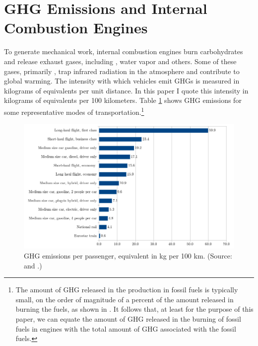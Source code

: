 \documentclass{article}[12pt,letterpaper]
\begin{document}
\section{GHG Emissions and Internal Combustion Engines}
To generate mechanical work, internal combustion engines burn carbohydrates and release exhaust gases, including \cadi, water vapor and others. Some of these gases, primarily \cadi, trap infrared radiation in the atmosphere and contribute to global warming. The intensity with which vehicles emit GHGs is measured in kilograms of \cadi equivalents per unit distance. In this paper I quote this intensity in kilograms of \cadi equivalents per 100 kilometers. Table \ref{fig:GHG-and-means-of-transportation} shows GHG emissions for some representative modes of transportation.\footnote{The amount of GHG released in the production in fossil fuels is typically small, on the order of magnitude of a percent of the amount released in burning the fuels, as shown in \citet{yeh2017}. It follows that, at least for the purpose of this paper, we can equate the amount of GHG released in the burning of fossil fuels in engines with the total amount of GHG associated with the fossil fuels.}

\begin{figure}
  \centering
  \caption{GHG emissions per passenger, \cadi equivalent in kg per 100 km. (Source: \cite{greenhouse-gas-reporting-conversion-factors-2019} and \cite{travel-carbon-footprint}.)}
  \label{fig:GHG-and-means-of-transportation}
  \includegraphics[scale=0.5]{fig_1.png}
\end{figure}
\end{document}
